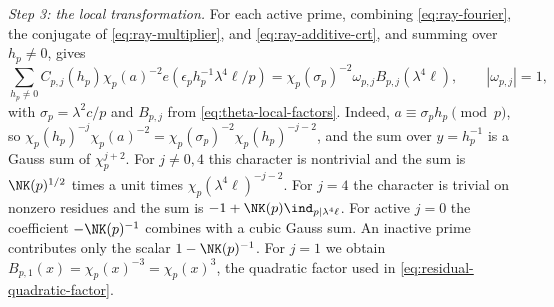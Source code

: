 \emph{Step 3: the local transformation.} For each active prime, combining
\eqref{eq:ray-fourier}, the conjugate of \eqref{eq:ray-multiplier}, and
\eqref{eq:ray-additive-crt}, and summing over $h_p\ne0$, gives
\begin{equation}\label{eq:ray-local-transform}
\sum_{h_p\ne0} C_{p,j}(h_p)\chi_p(a)^{-2}
 e(\epsilon_ph_p^{-1}\lambda^4\ell/p)
 =\chi_p(\sigma_p)^{-2}\omega_{p,j}B_{p,j}(\lambda^4\ell),\qquad|\omega_{p,j}|=1,
\end{equation}
with $\sigma_p=\lambda^2c/p$ and $B_{p,j}$ from \eqref{eq:theta-local-factors}. Indeed,
$a\equiv\sigma_ph_p\pmod p$, so $\chi_p(h_p)^{-j}\chi_p(a)^{-2}=\chi_p(\sigma_p)^{-2}\chi_p(h_p)^{-j-2}$,
and the sum over $y=h_p^{-1}$ is a Gauss sum of $\chi_p^{j+2}$. For $j\ne0,4$ this character is
nontrivial and the sum is $\NK(p)^{1/2}$ times a unit times $\chi_p(\lambda^4\ell)^{-j-2}$. For
$j=4$ the character is trivial on nonzero residues and the sum is $-1+\NK(p)\ind_{p\mid\lambda^4\ell}$.
For active $j=0$ the coefficient $-\NK(p)^{-1}$ combines with a cubic Gauss sum. An inactive
prime contributes only the scalar $1-\NK(p)^{-1}$. For $j=1$ we obtain
$B_{p,1}(x)=\chi_p(x)^{-3}=\chi_p(x)^3$, the quadratic factor used in
\eqref{eq:residual-quadratic-factor}.

